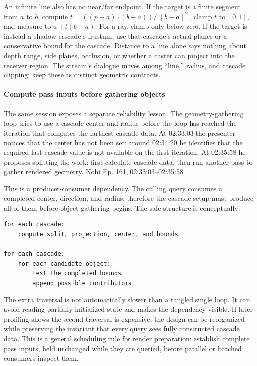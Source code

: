 An infinite line also has no near/far endpoint. If the target is a finite segment from \(a\) to \(b\), compute \(t=((p-a)\cdot(b-a))/\|b-a\|^2\), clamp \(t\) to \([0,1]\), and measure to \(a+t(b-a)\). For a ray, clamp only below zero. If the target is instead a shadow cascade's frustum, use that cascade's actual planes or a conservative bound for the cascade. Distance to a line alone says nothing about depth range, side planes, occlusion, or whether a caster can project into the receiver region. The stream's dialogue moves among ``line,'' radius, and cascade clipping; keep these as distinct geometric contracts.

\paragraph{Compute pass inputs before gathering objects}\label{compute-pass-inputs-before-gathering-objects}

The same session exposes a separate reliability lesson. The geometry-gathering loop tries to use a cascade center and radius before the loop has reached the iteration that computes the farthest cascade data. At 02:33:03 the presenter notices that the center has not been set; around 02:34:20 he identifies that the required last-cascade value is not available on the first iteration. At 02:35:58 he proposes splitting the work: first calculate cascade data, then run another pass to gather rendered geometry. \href{https://www.youtube.com/watch?v=dJYWL9YAelY&t=9183s}{Kohi Ep. 161, 02:33:03--02:35:58}

This is a producer-consumer dependency. The culling query consumes a completed center, direction, and radius; therefore the cascade setup must produce all of them before object gathering begins. The safe structure is conceptually:

\begin{verbatim}
for each cascade:
    compute split, projection, center, and bounds

for each cascade:
    for each candidate object:
        test the completed bounds
        append possible contributors
\end{verbatim}

The extra traversal is not automatically slower than a tangled single loop. It can avoid reading partially initialized state and makes the dependency visible. If later profiling shows the second traversal is expensive, the design can be reorganized while preserving the invariant that every query sees fully constructed cascade data. This is a general scheduling rule for render preparation: establish complete pass inputs, held unchanged while they are queried, before parallel or batched consumers inspect them.

